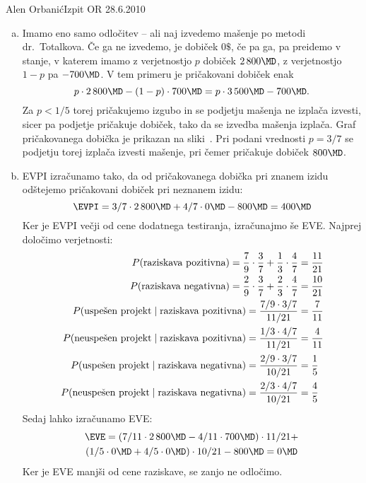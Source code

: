 \begin{naloga}{Alen Orbanić}{Izpit OR 28.6.2010}
\begin{odgovor}
\begin{enumerate}[(a)]
\item Imamo eno samo odločitev
-- ali naj izvedemo mašenje po metodi dr.~Totalkova.
Če ga ne izvedemo, je dobiček $0 \$$,
če pa ga, pa preidemo v stanje,
v katerem imamo z verjetnostjo $p$ dobiček $2\,800 \MD$,
z verjetnostjo $1-p$ pa $-700 \MD$.
V tem primeru je pričakovani dobiček enak
$$
p \cdot 2\,800 \MD - (1-p) \cdot 700 \MD
=  p \cdot 3\,500 \MD - 700 \MD .
$$
Za $p < 1/5$ torej pričakujemo izgubo
in se podjetju mašenja ne izplača izvesti,
sicer pa podjetje pričakuje dobiček, tako da se izvedba mašenja izplača.
Graf pričakovanega dobička je prikazan na sliki~\fig[bp-graf].
Pri podani vrednosti $p = 3/7$ se podjetju torej izplača izvesti mašenje,
pri čemer pričakuje dobiček $800 \MD$.

\item EVPI izračunamo tako,
da od pričakovanega dobička pri znanem izidu
odštejemo pričakovani dobiček pri neznanem izidu:
$$
\EVPI = 3/7 \cdot 2\,800 \MD + 4/7 \cdot 0 \MD - 800 \MD = 400 \MD
$$
Ker je EVPI večji od cene dodatnega testiranja, izračunajmo še EVE.
Najprej določimo verjetnosti:
\begin{align*}
P(\text{raziskava pozitivna}) =
{7 \over 9} \cdot {3 \over 7} + {1 \over 3} \cdot {4 \over 7}
&= {11 \over 21} \\
P(\text{raziskava negativna}) =
{2 \over 9} \cdot {3 \over 7} + {2 \over 3} \cdot {4 \over 7}
&= {10 \over 21} \\
P(\text{uspešen projekt} \mid \text{raziskava pozitivna}) =
{7/9 \cdot 3/7 \over 11/21} &= {7 \over 11} \\
P(\text{neuspešen projekt} \mid \text{raziskava pozitivna}) =
{1/3 \cdot 4/7 \over 11/21} &= {4 \over 11} \\
P(\text{uspešen projekt} \mid \text{raziskava negativna}) =
{2/9 \cdot 3/7 \over 10/21} &= {1 \over 5} \\
P(\text{neuspešen projekt} \mid \text{raziskava negativna}) =
{2/3 \cdot 4/7 \over 10/21} &= {4 \over 5}
\end{align*}
Sedaj lahko izračunamo EVE:
\begin{multline*}
\EVE = (7/11 \cdot 2\,800 \MD - 4/11 \cdot 700 \MD) \cdot 11/21 + \\
(1/5 \cdot 0 \MD + 4/5 \cdot 0 \MD) \cdot 10/21 - 800 \MD = 0 \MD
\end{multline*}
Ker je EVE manjši od cene raziskave, se zanjo ne odločimo.


\end{enumerate}
\end{odgovor}
\end{naloga}
